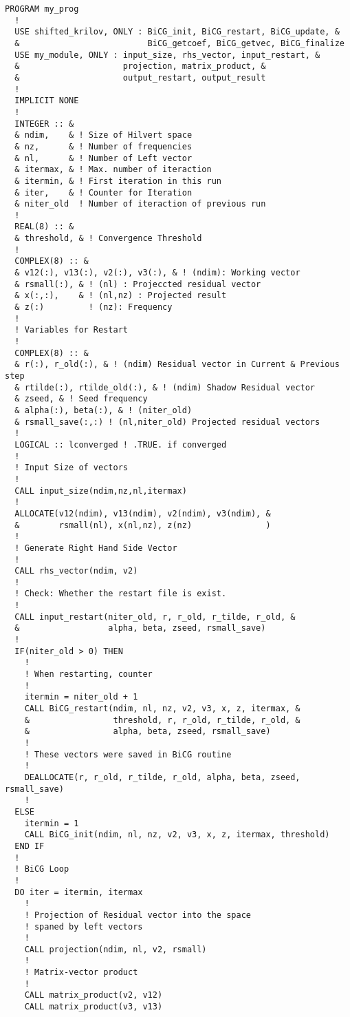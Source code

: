 \documentclass[12pt,titlepage]{jarticle}
\begin{document}
\begin{lstlisting}
PROGRAM my_prog
  !
  USE shifted_krilov, ONLY : BiCG_init, BiCG_restart, BiCG_update, &
  &                          BiCG_getcoef, BiCG_getvec, BiCG_finalize
  USE my_module, ONLY : input_size, rhs_vector, input_restart, &
  &                     projection, matrix_product, &
  &                     output_restart, output_result
  !
  IMPLICIT NONE
  !
  INTEGER :: &
  & ndim,    & ! Size of Hilvert space
  & nz,      & ! Number of frequencies
  & nl,      & ! Number of Left vector
  & itermax, & ! Max. number of iteraction
  & itermin, & ! First iteration in this run
  & iter,    & ! Counter for Iteration
  & niter_old  ! Number of iteraction of previous run
  !
  REAL(8) :: &
  & threshold, & ! Convergence Threshold
  !
  COMPLEX(8) :: &
  & v12(:), v13(:), v2(:), v3(:), & ! (ndim): Working vector
  & rsmall(:), & ! (nl) : Projeccted residual vector 
  & x(:,:),    & ! (nl,nz) : Projected result 
  & z(:)         ! (nz): Frequency
  !
  ! Variables for Restart
  !
  COMPLEX(8) :: &
  & r(:), r_old(:), & ! (ndim) Residual vector in Current & Previous step
  & rtilde(:), rtilde_old(:), & ! (ndim) Shadow Residual vector
  & zseed, & ! Seed frequency
  & alpha(:), beta(:), & ! (niter_old) 
  & rsmall_save(:,:) ! (nl,niter_old) Projected residual vectors
  !
  LOGICAL :: lconverged ! .TRUE. if converged
  !
  ! Input Size of vectors
  !
  CALL input_size(ndim,nz,nl,itermax)
  !
  ALLOCATE(v12(ndim), v13(ndim), v2(ndim), v3(ndim), &
  &        rsmall(nl), x(nl,nz), z(nz)               )
  !
  ! Generate Right Hand Side Vector
  !
  CALL rhs_vector(ndim, v2)
  !
  ! Check: Whether the restart file is exist.
  !
  CALL input_restart(niter_old, r, r_old, r_tilde, r_old, &
  &                  alpha, beta, zseed, rsmall_save)
  !
  IF(niter_old > 0) THEN
    !
    ! When restarting, counter
    !
    itermin = niter_old + 1
    CALL BiCG_restart(ndim, nl, nz, v2, v3, x, z, itermax, &
    &                 threshold, r, r_old, r_tilde, r_old, &
    &                 alpha, beta, zseed, rsmall_save)
    !
    ! These vectors were saved in BiCG routine
    !
    DEALLOCATE(r, r_old, r_tilde, r_old, alpha, beta, zseed, rsmall_save)
    !
  ELSE
    itermin = 1
    CALL BiCG_init(ndim, nl, nz, v2, v3, x, z, itermax, threshold)
  END IF
  !
  ! BiCG Loop
  !
  DO iter = itermin, itermax
    !
    ! Projection of Residual vector into the space
    ! spaned by left vectors
    !
    CALL projection(ndim, nl, v2, rsmall)
    !
    ! Matrix-vector product
    !
    CALL matrix_product(v2, v12)
    CALL matrix_product(v3, v13)

\end{lstlisting}
\end{document}
